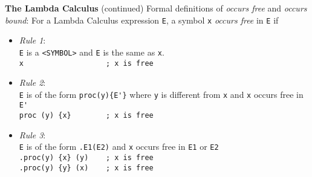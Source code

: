\begin{minipage}[t]{\sw}
\slidenumber
\LARGE
{\bf The Lambda Calculus} (continued)\exx
\Large
\emm\LightBox{\MYlambda}\exx
Formal definitions of {\em occurs free} and {\em occurs bound}:\exx
For a Lambda Calculus expression \verb'E', a symbol \verb'x'
{\em occurs free} in \verb'E' if
\begin{itemize}
\item   {\em Rule 1}:\\
	\verb'E' is a \verb'<SYMBOL>' and \verb'E' is the same as \verb'x'.\\
	\emm\verb'x                   ; x is free'
\item   {\em Rule 2}:\\
	\verb'E' is of the form \verb:proc(y){E'}:
	where \verb'y' is different from \verb'x'
	and \verb'x' occurs free in \verb:E':\\
	\emm\verb'proc (y) {x}        ; x is free'
\item   {\em Rule 3}:\\
	\verb'E' is of the form \verb'.E1(E2)'
	and \verb'x' occurs free in \verb'E1' or \verb'E2'\\
	\emm\verb'.proc(y) {x} (y)    ; x is free'\\
	\emm\verb'.proc(y) {y} (x)    ; x is free'\\
\end{itemize}
\end{minipage}
\clearpage
